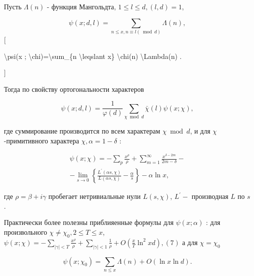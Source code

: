 \documentclass[10pt]{article}
\begin{document}
Пусть $\Lambda(n)$ - функция Мангольдта, $1 \leqslant l \leqslant d,(l, d)=1$,



\[

\psi(x ; d, l)=\sum_{n \leqslant x, n \equiv l(\bmod d)} \Lambda(n),

\][



\textbackslash psi(x ; \textbackslash chi)=\textbackslash sum\_\{n \textbackslash leqslant x\} \textbackslash chi(n) \textbackslash Lambda(n) .

]



Тогда по свойству ортогональности характеров



\[

\psi(x ; d, l)=\frac{1}{\varphi(d)} \sum_{\chi \bmod d} \bar{\chi}(l) \psi(x ; \chi),

\]



где суммирование производится по всем характерам $\chi \bmod d$, и для $\chi$-примитивного характера $\chi, \alpha=1-\delta$ :



\[

\begin{gathered}

\psi(x ; \chi)=-\sum_{p} \frac{x^{\rho}}{\rho}+\sum_{m=1}^{\infty} \frac{x^{\delta-2 m}}{2 m-\delta}- \\

-\lim _{s \rightarrow 0}\left\{\frac{L^{\prime}(\alpha s, \chi)}{L(\alpha s, \chi)}-\frac{\alpha}{s}\right\}-\alpha \ln x,

\end{gathered}

\]



где $\rho=\beta+i \gamma$ пробегает нетривиальные нули $L(s, \chi)$, $L^{\prime}-$ производная $L$ по $s$.



Практически более полезны приблияенные формулы для $\psi(x ; \alpha)$ : для произвольного $\chi \neq \chi_{0}, 2 \leqslant T \leqslant x$, $\psi(x ; \chi)=-\sum_{|\gamma|<T} \frac{x^{\rho}}{\rho}+\sum_{|\gamma|<1} \frac{1}{\rho}+O\left(\frac{x}{T} \ln ^{2} x d\right),(7)$ а для $\chi=\chi_{0}$



\[

\psi\left(x ; \chi_{0}\right)=\sum_{n \leqslant x} \Lambda(n)+O(\ln x \ln d) .

\]
\end{document}

